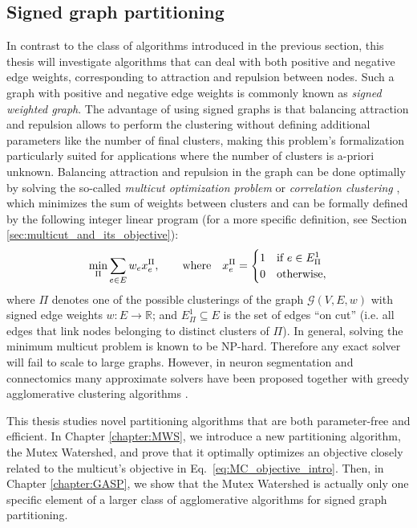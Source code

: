 \subsection{Signed graph partitioning}
In contrast to the class of algorithms introduced in the previous section, this thesis will investigate algorithms that can
deal with both positive and negative edge weights, corresponding to attraction and repulsion between nodes. Such a graph with positive and negative edge weights is commonly known as \emph{signed weighted graph}. The advantage of using signed graphs is that balancing attraction and repulsion allows to perform the clustering without defining additional parameters like the number of final clusters, making this problem's formalization particularly suited for applications where the number of clusters is a-priori unknown. Balancing attraction and repulsion in the graph can be done optimally by solving the so-called \emph{multicut optimization problem} or \emph{correlation clustering} \cite{kappes2011globally,chopra1991multiway}, which minimizes the sum of weights between clusters and can be formally defined by the following integer linear program (for a more specific definition, see Section \ref{sec:multicut_and_its_objective}):
\begin{equation}\label{eq:MC_objective_intro}
 \min_\Pi \sum_{e\in E} w_e x_e^\Pi,  \qquad \text{where} \quad x^\Pi_e = 
 \begin{cases} 
 1 & \text{if } e\in E^1_\Pi \\
 0 & \text{otherwise},
 \end{cases}
\end{equation}
where $\Pi$ denotes one of the possible clusterings of the graph $\mathcal{G}(V,E,w)$ with signed edge weights $w:E\rightarrow \mathbb{R}$; and $E_\Pi^1 \subseteq E$ is the set of edges ``on cut'' (i.e. all edges that link nodes belonging to distinct clusters of $\Pi$). 
In general, solving the minimum multicut problem is known to be NP-hard. Therefore any exact solver will fail to scale to large graphs. However, in neuron segmentation and connectomics many approximate solvers have been proposed \cite{lange2018combinatorial,pape2017solving,beier2016efficient,yarkony2012fast} together with greedy agglomerative clustering algorithms \cite{keuper2015efficient,levinkov2017comparative,kardoostsolving}. 

This thesis studies novel partitioning algorithms that are both parameter-free and efficient. In Chapter \ref{chapter:MWS}, we introduce a new partitioning algorithm, the Mutex Watershed, and prove that it optimally optimizes an objective closely related to the multicut's objective in Eq.~\ref{eq:MC_objective_intro}. Then, in Chapter \ref{chapter:GASP}, we show that the Mutex Watershed is actually only one specific element of a larger class of agglomerative algorithms for signed graph partitioning.



